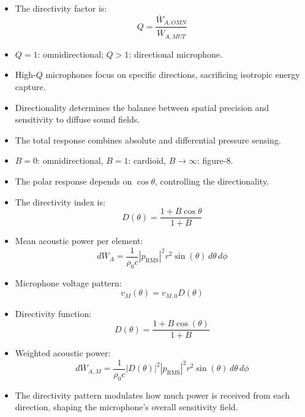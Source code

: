 \begin{tcolorbox}[colback=gray!10!white,colframe=black,title=\textbf{Summary – Microphone Directionality}]
\begin{itemize}
    \item The directivity factor is:
    \[
    Q = \frac{\overline{W}_{A,OMN}}{\overline{W}_{A,MUT}}
    \]
    \item \( Q = 1 \): omnidirectional; \( Q > 1 \): directional microphone.
    \item High-\( Q \) microphones focus on specific directions, sacrificing isotropic energy capture.
    \item Directionality determines the balance between spatial precision and sensitivity to diffuse sound fields.
\end{itemize}
\end{tcolorbox}

\begin{tcolorbox}[colback=gray!10!white,colframe=black,title=\textbf{Summary – Combined Pressure and Gradient Microphones}]
\begin{itemize}
    \item The total response combines absolute and differential pressure sensing.  
    \item \( B = 0 \): omnidirectional, \( B = 1 \): cardioid, \( B \rightarrow \infty \): figure-8.
    \item The polar response depends on \( \cos\theta \), controlling the directionality.
    \item The directivity index is:
    \[
    D(\theta) = \frac{1 + B\cos\theta}{1 + B}
    \]
\end{itemize}
\end{tcolorbox}

\begin{tcolorbox}[colback=gray!10!white,colframe=black,title=\textbf{Summary – Mean Acoustic Power and Microphone Directivity}]
\begin{itemize}
    \item Mean acoustic power per element:
    \[
    d\overline{W}_A = \frac{1}{\rho_0 c} |p_{\text{RMS}}|^2 r^2 \sin(\theta)\, d\theta\, d\phi
    \]
    \item Microphone voltage pattern:
    \[
    v_M(\theta) = v_{M,0} D(\theta)
    \]
    \item Directivity function:
    \[
    D(\theta) = \frac{1 + B\cos(\theta)}{1 + B}
    \]
    \item Weighted acoustic power:
    \[
    d\overline{W}_{A,M} = \frac{1}{\rho_0 c} |D(\theta)|^2 |p_{\text{RMS}}|^2 r^2 \sin(\theta)\, d\theta\, d\phi
    \]
    \item The directivity pattern modulates how much power is received from each direction, shaping the microphone’s overall sensitivity field.
\end{itemize}
\end{tcolorbox}



